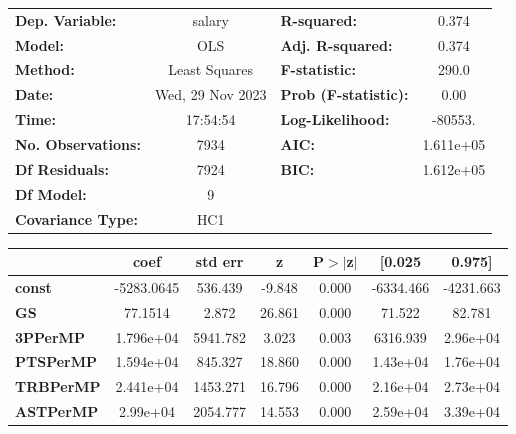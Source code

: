 \begin{center}
\begin{tabular}{lclc}
\toprule
\textbf{Dep. Variable:}    &      salary      & \textbf{  R-squared:         } &     0.374   \\
\textbf{Model:}            &       OLS        & \textbf{  Adj. R-squared:    } &     0.374   \\
\textbf{Method:}           &  Least Squares   & \textbf{  F-statistic:       } &     290.0   \\
\textbf{Date:}             & Wed, 29 Nov 2023 & \textbf{  Prob (F-statistic):} &     0.00    \\
\textbf{Time:}             &     17:54:54     & \textbf{  Log-Likelihood:    } &   -80553.   \\
\textbf{No. Observations:} &        7934      & \textbf{  AIC:               } & 1.611e+05   \\
\textbf{Df Residuals:}     &        7924      & \textbf{  BIC:               } & 1.612e+05   \\
\textbf{Df Model:}         &           9      & \textbf{                     } &             \\
\textbf{Covariance Type:}  &       HC1        & \textbf{                     } &             \\
\bottomrule
\end{tabular}
\begin{tabular}{lcccccc}
                       & \textbf{coef} & \textbf{std err} & \textbf{z} & \textbf{P$> |$z$|$} & \textbf{[0.025} & \textbf{0.975]}  \\
\midrule
\textbf{const}         &   -5283.0645  &      536.439     &    -9.848  &         0.000        &    -6334.466    &    -4231.663     \\
\textbf{GS}            &      77.1514  &        2.872     &    26.861  &         0.000        &       71.522    &       82.781     \\
\textbf{3PPerMP}       &    1.796e+04  &     5941.782     &     3.023  &         0.003        &     6316.939    &     2.96e+04     \\
\textbf{PTSPerMP}      &    1.594e+04  &      845.327     &    18.860  &         0.000        &     1.43e+04    &     1.76e+04     \\
\textbf{TRBPerMP}      &    2.441e+04  &     1453.271     &    16.796  &         0.000        &     2.16e+04    &     2.73e+04     \\
\textbf{ASTPerMP}      &     2.99e+04  &     2054.777     &    14.553  &         0.000        &     2.59e+04    &     3.39e+04     \\

\end{tabular}
\end{center}
